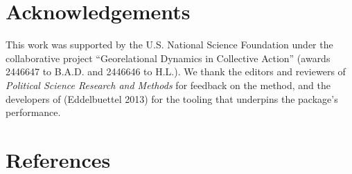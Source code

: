 \documentclass[10pt,a4paper,onecolumn]{article}
\let\textttOrig=\texttt
\def\texttt#1{\expandafter\textttOrig{\seqsplit{#1}}}
\let\addcontentslineOrig=\addcontentsline
\def\addcontentsline#1#2#3{\bgroup
  \let\texttt=\textttOrig\addcontentslineOrig{#1}{#2}{#3}\egroup}
\begin{document}
\section{Acknowledgements}\label{acknowledgements}

This work was supported by the U.S. National Science Foundation under the
collaborative project ``Georelational Dynamics in Collective Action'' (awards
2446647 to B.A.D. and 2446646 to H.L.). We thank the editors and reviewers of
\emph{Political Science Research and Methods} for feedback on the method, and the
developers of \texttt{Rcpp} (Eddelbuettel 2013) for the tooling that underpins the
package's performance.

\section*{References}\label{references}
\end{document}

